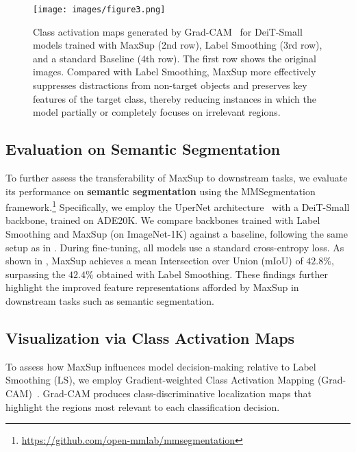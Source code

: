 \begin{figure*}[t]
\captionsetup{font=footnotesize,labelfont=footnotesize}
\centering
\texttt{[image: images/figure3.png]}
\vspace{-0.5cm}

\caption{Class activation maps generated by Grad-CAM~\citep{Selvaraju_2019} for DeiT-Small models trained with MaxSup (2nd row), Label Smoothing (3rd row), and a standard Baseline (4th row). The first row shows the original images. Compared with Label Smoothing, MaxSup more effectively suppresses distractions from non-target objects and preserves key features of the target class, thereby reducing instances in which the model partially or completely focuses on irrelevant regions.}
\label{fig:gradcam}
\vspace{-0.5cm}
\end{figure*}



\subsection{Evaluation on Semantic Segmentation }
\label{sec:train2}
To further assess the transferability of MaxSup to downstream tasks, we evaluate its performance on \textbf{semantic segmentation} using the MMSegmentation framework.\footnote{\label{mmsegmentation}\url{https://github.com/open-mmlab/mmsegmentation}} 
Specifically, we employ the UperNet architecture~\citep{xiao2018unified} with a DeiT-Small backbone, trained on ADE20K. 
We compare backbones trained with Label Smoothing and MaxSup (on ImageNet-1K) against a baseline, following the same setup as in . 
During fine-tuning, all models use a standard cross-entropy loss.
As shown in , MaxSup achieves a mean Intersection over Union (mIoU) of $42.8\%$, surpassing the $42.4\%$ obtained with Label Smoothing. 
These findings further highlight the improved feature representations afforded by MaxSup in downstream tasks such as semantic segmentation.


\subsection{Visualization via Class Activation Maps}
\label{sec:class_activation_map}

To assess how MaxSup influences model decision-making relative to Label Smoothing (LS), we employ Gradient-weighted Class Activation Mapping (Grad-CAM)~\citep{Selvaraju_2019}. Grad-CAM produces class-discriminative localization maps that highlight the regions most relevant to each classification decision.

